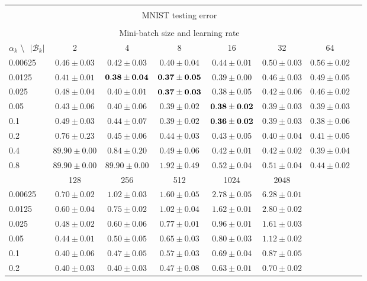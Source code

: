 \documentclass[10pt,journal,compsoc]{IEEEtran}
\begin{document}
\begin{table*}[!htbp]
\begin{center}
{\begin{tabular}{|l|c|c|c|c|c|c|c|}
\multicolumn{7}{|c|}{} \\
\multicolumn{7}{|c|}{MNIST testing error} \\
\multicolumn{7}{|c|}{} \\
\hline
\multicolumn{7}{|c|}{Mini-batch size and learning rate} \\
\hline
$\alpha_k$ \textbackslash $ \text{   } {|\mathcal{B}_k|}$ & 2 & 4 & 8 & 16 & 32 & 64 \\
\hline
0.00625 & $0.46\pm0.03$ & $0.42\pm0.03$ & $0.40\pm0.04$ & $0.44\pm0.01$ & $0.50\pm0.03$ & $0.56\pm0.02$ \\
\hline
0.0125 & $0.41\pm0.01$ & $\bf 0.38\pm0.04$ & $\bf 0.37\pm0.05$ & $0.39\pm0.00$ & $0.46\pm0.03$ & $0.49\pm0.05$ \\
\hline
0.025 & $0.48\pm0.04$ & $0.40\pm0.01$ & $\bf 0.37\pm0.03$ & $0.38\pm0.05$ & $0.42\pm0.06$ & $0.46\pm0.02$ \\
\hline
0.05  & $0.43\pm0.06$ & $0.40\pm0.06$ & $0.39\pm0.02$ & $\bf 0.38\pm0.02$ & $0.39\pm0.03$ & $0.39\pm0.03$  \\
\hline
0.1   & $0.49\pm0.03$ & $0.44\pm0.07$ & $0.39\pm0.02$ & $\bf 0.36\pm0.02$ & $0.39\pm0.03$ & $0.38\pm0.06$  \\
\hline
0.2   & $0.76\pm0.23$ & $0.45\pm0.06$ & $0.44\pm0.03$ & $0.43\pm0.05$ & $0.40\pm0.04$ & $0.41\pm0.05$  \\
\hline
0.4   & $89.90\pm0.00$ & $0.84\pm0.20$ & $0.49\pm0.06$ & $0.42\pm0.01$ & $0.42\pm0.02$ & $0.39\pm0.04$  \\
\hline
0.8   & $89.90\pm0.00$ & $89.90\pm0.00$ & $1.92\pm0.49$ & $0.52\pm0.04$ & $0.51\pm0.04$ & $0.44\pm0.02$  \\
\hline
& 128 & 256 & 512 & 1024 & 2048 \\
\hline
0.00625 & $0.70\pm0.02$ & $1.02\pm0.03$ & $1.60\pm0.05$ & $2.78\pm0.05$ & $6.28\pm0.01$ & \\
\hline
0.0125 & $0.60\pm0.04$ & $0.75\pm0.02$ & $1.02\pm0.04$ & $1.62\pm0.01$ & $2.80\pm0.02$ & \\
\hline
0.025 & $0.48\pm0.02$ & $0.60\pm0.06$ & $0.77\pm0.01$ & $0.96\pm0.01$ & $1.61\pm0.03$ & \\
\hline
0.05  & $0.44\pm0.01$ & $0.50\pm0.05$ & $0.65\pm0.03$ & $0.80\pm0.03$ & $1.12\pm0.02$ &  \\
\hline
0.1   & $0.40\pm0.06$ & $0.47\pm0.05$ & $0.57\pm0.03$ & $0.69\pm0.04$ & $0.87\pm0.05$ &  \\
\hline
0.2   & $0.40\pm0.03$ & $0.40\pm0.03$ & $0.47\pm0.08$ & $0.63\pm0.01$ & $0.70\pm0.02$ &  \\

\end{tabular}}
\end{center}
\end{table*}
\end{document}
